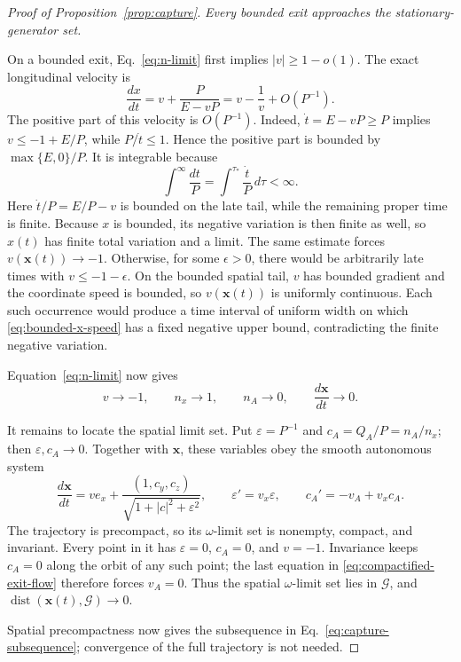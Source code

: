 \documentclass[10pt]{article}
\begin{document}
\begin{proof}[Proof of Proposition~\ref{prop:capture}]
\medskip\noindent\emph{Every bounded exit approaches the stationary-generator set.}

On a bounded exit, Eq.~\eqref{eq:n-limit} first implies
\(|v|\geq1-o(1)\).  The exact longitudinal velocity is
\begin{equation}
  \frac{dx}{dt}
    =v+\frac{P}{E-vP}
    =v-\frac1v+O(P^{-1}).
  \label{eq:bounded-x-speed}
\end{equation}
The positive part of this velocity is \(O(P^{-1})\).  Indeed,
\(\dot t=E-vP\geq P\) implies \(v\leq-1+E/P\), while
\(P/\dot t\leq1\).  Hence the positive part is bounded by
\(\max\{E,0\}/P\).  It is integrable because
\begin{equation}
  \int^\infty\frac{dt}{P}
    =\int^{\tau_*}\frac{\dot t}{P}\,d\tau<\infty .
  \label{eq:inverse-p-integrable}
\end{equation}
Here \(\dot t/P=E/P-v\) is bounded on the late tail, while the remaining
proper time is finite.
Because \(x\) is bounded, its negative variation is then finite as well, so
\(x(t)\) has finite total variation and a limit.  The same estimate forces
\(v(\boldsymbol{x}(t))\to-1\).  Otherwise, for some \(\epsilon>0\), there
would be arbitrarily late times with \(v\leq-1-\epsilon\).  On the bounded
spatial tail, \(v\) has bounded gradient and the coordinate speed is bounded,
so \(v(\boldsymbol{x}(t))\) is uniformly continuous.  Each such occurrence
would produce a time interval of uniform width on which
\eqref{eq:bounded-x-speed} has a fixed negative upper bound, contradicting the
finite negative variation.

Equation~\eqref{eq:n-limit} now gives
\begin{equation}
  v\longrightarrow-1,\qquad
  n_x\longrightarrow1,
  \qquad n_A\longrightarrow0,
  \qquad \frac{d\boldsymbol{x}}{dt}\longrightarrow0.
  \label{eq:spatial-direction-limit}
\end{equation}

It remains to locate the spatial limit set.  Put
\(\varepsilon=P^{-1}\) and \(c_A=Q_A/P=n_A/n_x\); then
\(\varepsilon,c_A\to0\).  Together with \(\boldsymbol{x}\), these variables
obey the smooth autonomous system
\begin{equation}
  \frac{d\boldsymbol{x}}{dt}
    =ve_x+\frac{(1,c_y,c_z)}{\sqrt{1+|c|^2+\varepsilon^2}},
  \qquad
  \varepsilon'=v_x\varepsilon,
  \qquad
  c_A'=-v_A+v_xc_A.
  \label{eq:compactified-exit-flow}
\end{equation}
The trajectory is precompact, so its \(\omega\)-limit set is nonempty, compact, and
invariant.  Every point in it has
\(\varepsilon=0\), \(c_A=0\), and \(v=-1\).  Invariance keeps \(c_A=0\) along
the orbit of any such point; the last equation in
\eqref{eq:compactified-exit-flow} therefore forces \(v_A=0\).  Thus the spatial
\(\omega\)-limit set lies in \(\mathcal G\), and
\(\operatorname{dist}(\boldsymbol{x}(t),\mathcal G)\to0\).

Spatial precompactness now gives the subsequence in
Eq.~\eqref{eq:capture-subsequence}; convergence of the full trajectory is not
needed.
\end{proof}
\end{document}
